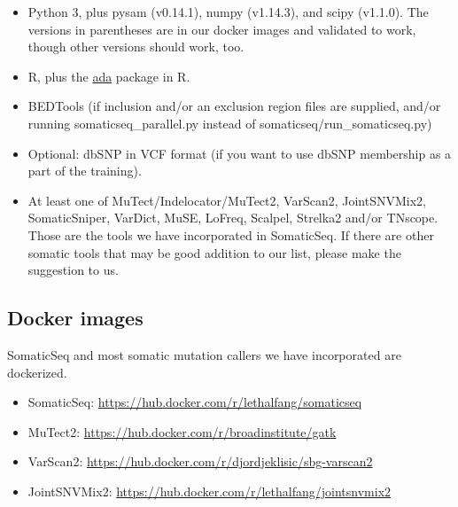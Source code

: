 \documentclass[10pt,letterpaper]{article}
\begin{document}
\begin{sloppypar}
\begin{itemize}
\item
Python 3, plus pysam (v0.14.1), numpy (v1.14.3), and scipy (v1.1.0). The versions in parentheses are in our docker images and validated to work, though other versions should work, too.

\item
R, plus the \href{https://cran.r-project.org/package=ada}{ada} package in R.

\item
BEDTools (if inclusion and/or an exclusion region files are supplied, and/or running somaticseq\_parallel.py instead of somaticseq/run\_somaticseq.py)

\item
Optional: dbSNP in VCF format (if you want to use dbSNP membership as a part of the training).

\item
At least one of MuTect/Indelocator/MuTect2, VarScan2, JointSNVMix2, SomaticSniper, VarDict, MuSE, LoFreq, Scalpel, Strelka2 and/or TNscope. Those are the tools we have incorporated in SomaticSeq. If there are other somatic tools that may be good addition to our list, please make the suggestion to us. 

\end{itemize}


\subsection{Docker images}

SomaticSeq and most somatic mutation callers we have incorporated are dockerized. 

\begin{itemize}

  \item SomaticSeq:    \href{https://hub.docker.com/r/lethalfang/somaticseq}{https://hub.docker.com/r/lethalfang/somaticseq}
  
  \item MuTect2:       \href{https://hub.docker.com/r/broadinstitute/gatk}{https://hub.docker.com/r/broadinstitute/gatk}

  \item VarScan2:      \href{https://hub.docker.com/r/djordjeklisic/sbg-varscan2}{https://hub.docker.com/r/djordjeklisic/sbg-varscan2}

  \item JointSNVMix2:  \href{https://hub.docker.com/r/lethalfang/jointsnvmix2}{https://hub.docker.com/r/lethalfang/jointsnvmix2}


\end{itemize}
\end{sloppypar}
\end{document}
